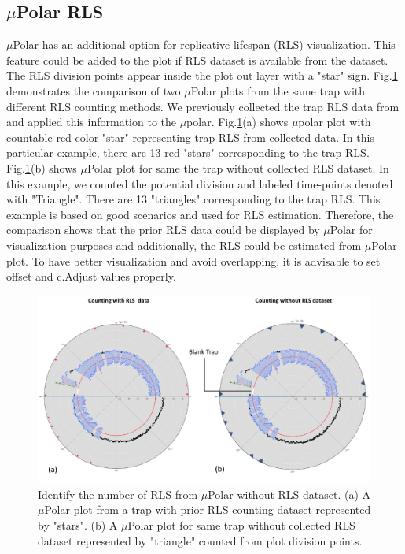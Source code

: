 \documentclass[conference]{IEEEtran}
\begin{document}
\subsection{$\mu$Polar RLS}

$\mu$Polar has an additional option for replicative lifespan (RLS) visualization. This feature could be added to the plot if RLS dataset is available from the dataset. The RLS division points appear inside the plot out layer with a "star" sign. Fig.\ref{fig:rls} demonstrates the comparison of two $\mu$Polar plots from the same trap with different RLS counting methods. We previously collected the trap RLS data from \cite{ref02.2} and applied this information to the $\mu$polar. Fig.\ref{fig:rls}(a) shows $\mu$polar plot with countable red color "star" representing trap RLS from collected data. In this particular example, there are 13 red "stars" corresponding to the trap RLS. Fig.\ref{fig:rls}(b) shows $\mu$Polar plot for same the trap without collected RLS dataset. In this example, we counted the potential division and labeled time-points denoted with "Triangle". There are 13 "triangles" corresponding to the trap RLS. This example is based on good scenarios and used for RLS estimation. Therefore, the comparison shows that the prior RLS data could be displayed by $\mu$Polar for visualization purposes and additionally, the RLS could be estimated from $\mu$Polar plot. To have better visualization and avoid overlapping, it is advisable to set offset and c.Adjust values properly.       


\begin{figure}
\centering
\includegraphics[width=\textwidth,height=10 cm]{Patterns/rls10.pdf}
\caption{ Identify the number of RLS from $\mu$Polar without RLS dataset. (a) A $\mu$Polar plot from a trap with prior RLS counting dataset represented by "stars". (b)  A $\mu$Polar plot for same trap without collected RLS dataset represented by "triangle" counted from plot division points.}
\label{fig:rls}
\end{figure}
\end{document}
